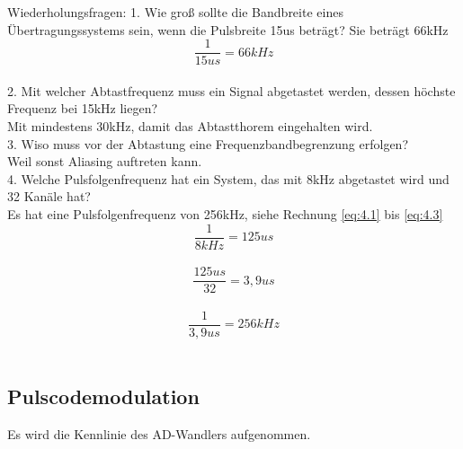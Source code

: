 \documentclass[12pt,a4paper]{scrartcl}
\begin{document}
  Wiederholungsfragen:
  1. Wie groß sollte die Bandbreite eines Übertragungssystems sein, wenn die Pulsbreite 15us beträgt?
  Sie beträgt 66kHz
  \begin{equation}
		\frac{1}{15us} =66kHz
    \end{equation}\\
    2. Mit welcher Abtastfrequenz muss ein Signal abgetastet werden, dessen höchste Frequenz bei 15kHz liegen?\\
    Mit mindestens 30kHz, damit das Abtastthorem eingehalten wird.\\
    3. Wiso muss vor der Abtastung eine Frequenzbandbegrenzung erfolgen?\\
    Weil sonst Aliasing auftreten kann.\\
    4. Welche Pulsfolgenfrequenz hat ein System, das mit 8kHz abgetastet wird und 32 Kanäle hat?\\
    Es hat eine Pulsfolgenfrequenz von 256kHz, siehe Rechnung \ref{eq:4.1} bis \ref{eq:4.3}
    \begin{equation}
    	\label{eq:4.1}
		\frac{1}{8kHz} = 125us
    \end{equation}\\
    \begin{equation}
		\frac{125us}{32} = 3,9us
    \end{equation}\\
    \begin{equation}
    	\label{eq:4.3}
		\frac{1}{3,9us} = 256kHz
    \end{equation}\\
  \newpage
  \subsection{Pulscodemodulation}
  \label{sub-sec-pulscodemodulation}
Es wird die Kennlinie des AD-Wandlers aufgenommen.\\
  \loadedtable
\pgfplotstabletranspose[]{\transposetable}{\loadedtable}  
\loadedtable

	
\end{document}
